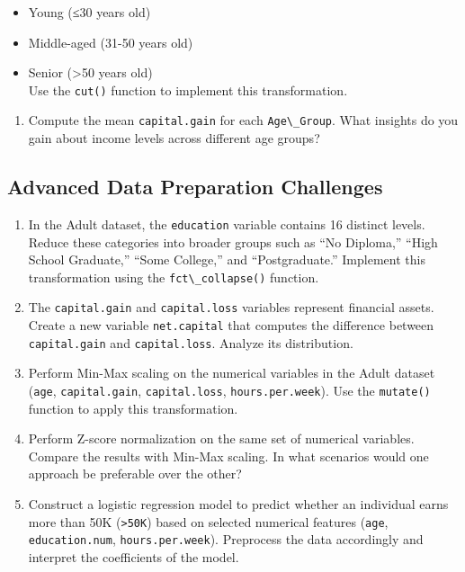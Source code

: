 \documentclass[
]{book}
\newcommand{\passthrough}[1]{#1}
\providecommand{\tightlist}{%
  \setlength{\itemsep}{0pt}\setlength{\parskip}{0pt}}
\theoremstyle{definition}
\theoremstyle{definition}
\theoremstyle{definition}
\theoremstyle{definition}
\theoremstyle{remark}
\begin{document}
\begin{itemize}
\tightlist
\item
  Young (≤30 years old)\\
\item
  Middle-aged (31-50 years old)\\
\item
  Senior (\textgreater50 years old)\\
  Use the \passthrough{\lstinline!cut()!} function to implement this transformation.
\end{itemize}

\begin{enumerate}
\def\labelenumi{\arabic{enumi}.}
\setcounter{enumi}{14}
\tightlist
\item
  Compute the mean \passthrough{\lstinline!capital.gain!} for each \passthrough{\lstinline!Age\_Group!}. What insights do you gain about income levels across different age groups?
\end{enumerate}

\subsection*{Advanced Data Preparation Challenges}\label{advanced-data-preparation-challenges}

\begin{enumerate}
\def\labelenumi{\arabic{enumi}.}
\setcounter{enumi}{15}
\item
  In the Adult dataset, the \passthrough{\lstinline!education!} variable contains 16 distinct levels. Reduce these categories into broader groups such as ``No Diploma,'' ``High School Graduate,'' ``Some College,'' and ``Postgraduate.'' Implement this transformation using the \passthrough{\lstinline!fct\_collapse()!} function.
\item
  The \passthrough{\lstinline!capital.gain!} and \passthrough{\lstinline!capital.loss!} variables represent financial assets. Create a new variable \passthrough{\lstinline!net.capital!} that computes the difference between \passthrough{\lstinline!capital.gain!} and \passthrough{\lstinline!capital.loss!}. Analyze its distribution.
\item
  Perform Min-Max scaling on the numerical variables in the Adult dataset (\passthrough{\lstinline!age!}, \passthrough{\lstinline!capital.gain!}, \passthrough{\lstinline!capital.loss!}, \passthrough{\lstinline!hours.per.week!}). Use the \passthrough{\lstinline!mutate()!} function to apply this transformation.
\item
  Perform Z-score normalization on the same set of numerical variables. Compare the results with Min-Max scaling. In what scenarios would one approach be preferable over the other?
\item
  Construct a logistic regression model to predict whether an individual earns more than 50K (\passthrough{\lstinline!>50K!}) based on selected numerical features (\passthrough{\lstinline!age!}, \passthrough{\lstinline!education.num!}, \passthrough{\lstinline!hours.per.week!}). Preprocess the data accordingly and interpret the coefficients of the model.
\end{enumerate}
\end{document}
